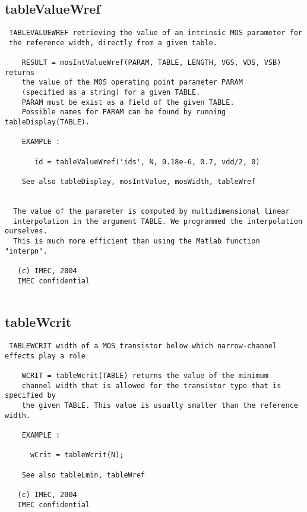 \subsection{tableValueWref}
\label{sec:tableValueWref}
\begin{verbatim}
 TABLEVALUEWREF retrieving the value of an intrinsic MOS parameter for 
 the reference width, directly from a given table.
                                                                           
    RESULT = mosIntValueWref(PARAM, TABLE, LENGTH, VGS, VDS, VSB) returns
    the value of the MOS operating point parameter PARAM 
    (specified as a string) for a given TABLE.   
    PARAM must be exist as a field of the given TABLE. 
    Possible names for PARAM can be found by running tableDisplay(TABLE).
 
    EXAMPLE :                                                                
 
       id = tableValueWref('ids', N, 0.18e-6, 0.7, vdd/2, 0)                            
   
    See also tableDisplay, mosIntValue, mosWidth, tableWref
    
 
  The value of the parameter is computed by multidimensional linear 
  interpolation in the argument TABLE. We programmed the interpolation ourselves.
  This is much more efficient than using the Matlab function "interpn".
 
   (c) IMEC, 2004
   IMEC confidential 
 

\end{verbatim}

\newpage
\subsection{tableWcrit}
\label{sec:tableWcrit}
\begin{verbatim}
 TABLEWCRIT width of a MOS transistor below which narrow-channel effects play a role 
 
    WCRIT = tableWcrit(TABLE) returns the value of the minimum
    channel width that is allowed for the transistor type that is specified by
    the given TABLE. This value is usually smaller than the reference width.
 
    EXAMPLE :
 
      wCrit = tableWcrit(N);
 
    See also tableLmin, tableWref
 
   (c) IMEC, 2004
   IMEC confidential 
 

\end{verbatim}

